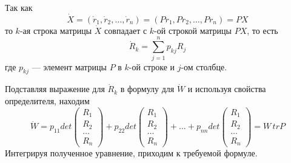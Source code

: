 Так как
\begin{equation*}
    \dot{X} = (\dot{r}_1, \dot{r}_2, \ldots, \dot{r}_n) = (Pr_1, Pr_2, \ldots, Pr_n) = PX
\end{equation*}
то $k$-ая строка матрицы $\dot{X}$ совпадает с $k$-ой строкой матрицы $PX$, то есть
\begin{equation*}
    \dot{R}_k = \sum_{j=1}^n p_{kj}R_j
\end{equation*}
где $p_{kj}$ --- элемент матрицы $P$ в $k$-ой строке и $j$-ом столбце.

Подставляя выражение для $\dot{R}_k$ в формулу для $\dot{W}$ и используя свойства определителя, находим
\begin{equation*}
    \dot{W} = p_{11}det\begin{pmatrix}
    R_1\\
    R_2\\
    \ldots\\
    R_n
    \end{pmatrix} + p_{22}det\begin{pmatrix}
    R_1\\
    R_2\\
    \ldots\\
    R_n
    \end{pmatrix} + \ldots + p_{nn}det\begin{pmatrix}
    R_1\\
    R_2\\
    \ldots\\
    R_n
    \end{pmatrix} = W\,trP
\end{equation*}
Интегрируя полученное уравнение, приходим к требуемой формуле.